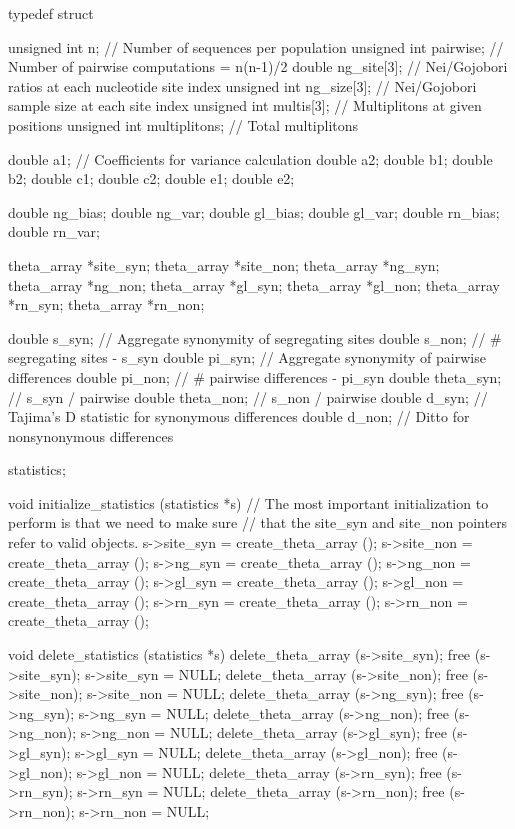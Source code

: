 \documentclass{article}
\begin{document}
\begin{ccode}
typedef struct {
  unsigned int	n;     		// Number of sequences per population
  unsigned int	pairwise;	// Number of pairwise computations = n(n-1)/2
  double	ng_site[3];	// Nei/Gojobori ratios at each nucleotide site index
  unsigned int	ng_size[3];	// Nei/Gojobori sample size at each site index
  unsigned int	multis[3];	// Multiplitons at given positions
  unsigned int	multiplitons;	// Total multiplitons

  double	a1;		// Coefficients for variance calculation
  double	a2;
  double	b1;
  double	b2;
  double	c1;
  double	c2;
  double	e1;
  double	e2;

  double	ng_bias;
  double	ng_var;
  double	gl_bias;
  double	gl_var;
  double	rn_bias;
  double	rn_var;

  theta_array 	*site_syn;
  theta_array 	*site_non;
  theta_array 	*ng_syn;
  theta_array 	*ng_non;
  theta_array 	*gl_syn;
  theta_array 	*gl_non;
  theta_array 	*rn_syn;
  theta_array 	*rn_non;

  double	s_syn;		// Aggregate synonymity of segregating sites
  double	s_non;		// # segregating sites - s_syn
  double	pi_syn;		// Aggregate synonymity of pairwise differences
  double	pi_non;		// # pairwise differences - pi_syn
  double	theta_syn;	// s_syn / pairwise
  double	theta_non;	// s_non / pairwise
  double	d_syn;		// Tajima’s D statistic for synonymous differences
  double	d_non;		// Ditto for nonsynonymous differences
} statistics;

void initialize_statistics (statistics *s) {
  // The most important initialization to perform is that we need to make sure
  // that the site_syn and site_non pointers refer to valid objects.
  s->site_syn = create_theta_array ();
  s->site_non = create_theta_array ();
  s->ng_syn = create_theta_array   ();
  s->ng_non = create_theta_array   ();
  s->gl_syn = create_theta_array   ();
  s->gl_non = create_theta_array   ();
  s->rn_syn = create_theta_array   ();
  s->rn_non = create_theta_array   ();
}

void delete_statistics (statistics *s) {
  delete_theta_array (s->site_syn); free (s->site_syn); s->site_syn = NULL;
  delete_theta_array (s->site_non); free (s->site_non); s->site_non = NULL;
  delete_theta_array (s->ng_syn);   free (s->ng_syn);	s->ng_syn = NULL;
  delete_theta_array (s->ng_non);   free (s->ng_non);	s->ng_non = NULL;
  delete_theta_array (s->gl_syn);   free (s->gl_syn);	s->gl_syn = NULL;
  delete_theta_array (s->gl_non);   free (s->gl_non);	s->gl_non = NULL;
  delete_theta_array (s->rn_syn);   free (s->rn_syn);	s->rn_syn = NULL;
  delete_theta_array (s->rn_non);   free (s->rn_non);	s->rn_non = NULL;
}
\end{ccode}
\end{document}
